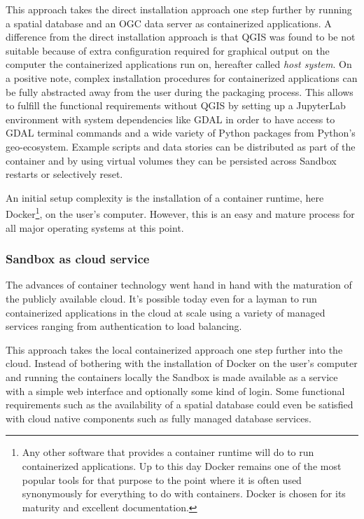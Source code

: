 \documentclass[11pt, a4paper, oneside, parskip=full-]{scrartcl}
\begin{document}
This approach takes the direct installation approach one step further by running
a spatial database and an OGC data server as containerized applications. A
difference from the direct installation approach is that QGIS was found to be
not suitable because of extra configuration required for graphical output on the
computer the containerized applications run on, hereafter called \emph{host
system}. On a positive note, complex installation procedures for containerized
applications can be fully abstracted away from the user during the packaging
process. This allows to fulfill the functional requirements without QGIS by
setting up a JupyterLab environment with system dependencies like GDAL in order
to have access to GDAL terminal commands and a wide variety of Python packages
from Python's geo-ecosystem. Example scripts and data stories can be distributed
as part of the container and by using virtual volumes they can be persisted
across Sandbox restarts or selectively reset.

An initial setup complexity is the installation of a container runtime, here
Docker\footnote{Any other software that provides a container runtime will do to
run containerized applications. Up to this day Docker remains one of the most
popular tools for that purpose to the point where it is often used synonymously
for everything to do with containers. Docker is chosen for its maturity and
excellent documentation.}, on the user's computer. However, this is an easy and
mature process for all major operating systems at this point.

\subsubsection*{Sandbox as cloud service}
The advances of container technology went hand in hand with the maturation of
the publicly available cloud. It's possible today even for a layman to run
containerized applications in the cloud at scale using a variety of managed
services ranging from authentication to load balancing.

This approach takes the local containerized approach one step further into the
cloud. Instead of bothering with the installation of Docker on the user's
computer and running the containers locally the Sandbox is made available as a
service with a simple web interface and optionally some kind of login. Some
functional requirements such as the availability of a spatial database could
even be satisfied with cloud native components such as fully managed database
services.
\end{document}
